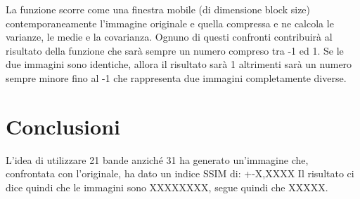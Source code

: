 \documentclass[a4paper,11pt]{article}
\begin{document}
    La funzione scorre come una finestra mobile (di dimensione block size) contemporaneamente l'immagine originale e quella compressa e ne calcola le varianze, le medie e la covarianza. 
    Ognuno di questi confronti contribuirà al risultato della funzione che sarà sempre un numero compreso tra -1 ed 1.
    Se le due immagini sono identiche, allora il risultato sarà 1 altrimenti sarà un numero sempre minore fino al -1 che rappresenta due immagini completamente diverse.
    
    \newpage
    
    \section{Conclusioni} 
    L'idea di utilizzare 21 bande anziché 31 ha generato un'immagine che, confrontata con l'originale, ha dato un indice SSIM di:
    +-X,XXXX
    Il risultato ci dice quindi che le immagini sono XXXXXXXX, segue quindi che XXXXX.
  
\end{document}
